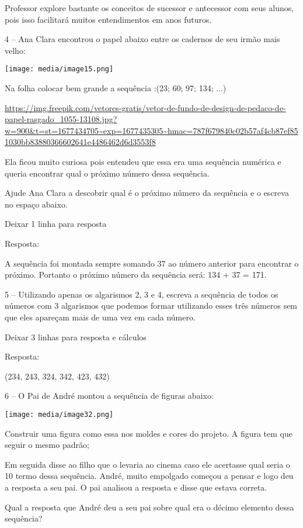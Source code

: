 Professor explore bastante os conceitos de sucessor e antecessor com
seus alunos, pois isso facilitará muitos entendimentos em anos futuros.

4 -- Ana Clara encontrou o papel abaixo entre os cadernos de seu irmão
mais velho:

\texttt{[image: media/image15.png]}

Na folha colocar bem grande a sequência :(23; 60; 97; 134; ...)

\url{https://img.freepik.com/vetores-gratis/vetor-de-fundo-de-design-de-pedaco-de-papel-rasgado_1055-13108.jpg?w=900\&t=st=1677434705~exp=1677435305~hmac=787f679840c02b57af4cb87ef851030bb83880366602641e4486462d6d3553f8}

Ela ficou muito curiosa pois entendeu que essa era uma sequência
numérica e queria encontrar qual o próximo número dessa sequência.

Ajude Ana Clara a descobrir qual é o próximo número da sequência e o
escreva no espaço abaixo.

Deixar 1 linha para resposta

Resposta:

A sequência foi montada sempre somando 37 ao número anterior para
encontrar o próximo. Portanto o próximo número da sequência será: 134 +
37 = 171.

5 -- Utilizando apenas os algarismos 2, 3 e 4, escreva a sequência de
todos os números com 3 algarismos que podemos formar utilizando esses
três números sem que eles apareçam mais de uma vez em cada número.

Deixar 3 linhas para resposta e cálculos

Resposta:

(234, 243, 324, 342, 423, 432)

6 -- O Pai de André montou a sequência de figuras abaixo:

\texttt{[image: media/image32.png]}

Construir uma figura como essa nos moldes e cores do projeto. A figura
tem que seguir o mesmo padrão;

Em seguida disse ao filho que o levaria ao cinema caso ele acertasse
qual seria o 10 termo dessa sequência. André, muito empolgado começou a
pensar e logo deu a resposta a seu pai. O pai analisou a resposta e
disse que estava correta.

Qual a resposta que André deu a seu pai sobre qual era o décimo elemento
dessa sequência?


